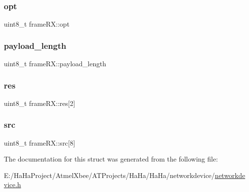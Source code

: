 \mbox{\label{structframe_r_x_a46a068d1f1deb22e9e415b1ced537516}} 
\subsubsection{\texorpdfstring{opt}{opt}}
{\footnotesize\ttfamily uint8\+\_\+t frame\+R\+X\+::opt}

\mbox{\label{structframe_r_x_a8ffb1ad18c41d6943c8172042f965123}} 
\subsubsection{\texorpdfstring{payload\+\_\+length}{payload\_length}}
{\footnotesize\ttfamily uint8\+\_\+t frame\+R\+X\+::payload\+\_\+length}

\mbox{\label{structframe_r_x_a339160d2b3a24b3db0ea4318fc36227c}} 
\subsubsection{\texorpdfstring{res}{res}}
{\footnotesize\ttfamily uint8\+\_\+t frame\+R\+X\+::res\mbox{[}2\mbox{]}}

\mbox{\label{structframe_r_x_a4a465dedf00b5d81f2f337c987b0ce96}} 
\subsubsection{\texorpdfstring{src}{src}}
{\footnotesize\ttfamily uint8\+\_\+t frame\+R\+X\+::src\mbox{[}8\mbox{]}}



The documentation for this struct was generated from the following file\+:\begin{DoxyCompactItemize}
\item 
E\+:/\+Ha\+Ha\+Project/\+Atmel\+Xbee/\+A\+T\+Projects/\+Ha\+Ha/\+Ha\+Ha/networkdevice/\hyperlink{networkdevice_8h}{networkdevice.\+h}\end{DoxyCompactItemize}

